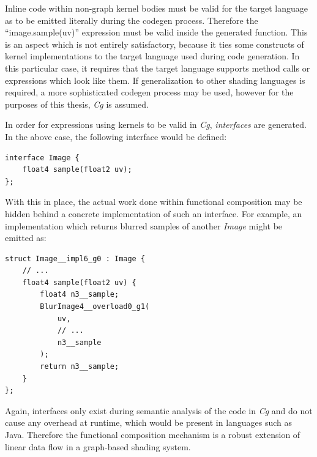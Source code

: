 Inline code within non-graph kernel bodies must be valid for the target language as to be emitted literally during the codegen process. Therefore the ``image.sample(uv)'' expression must be valid inside the generated function. This is an aspect which is not entirely satisfactory, because it ties some constructs of kernel implementations to the target language used during code generation. In this particular case, it requires that the target language supports method calls or expressions which look like them. If generalization to other shading languages is required, a more sophisticated codegen process may be used, however for the purposes of this thesis, \emph{Cg} is assumed.

In order for expressions using kernels to be valid in \emph{Cg}, \emph{interfaces} are generated. In the above case, the following interface would be defined:
\begin{lstlisting}[frame=single]
interface Image {
	float4 sample(float2 uv);
};
\end{lstlisting}

With this in place, the actual work done within functional composition may be hidden behind a concrete implementation of such an interface. For example, an implementation which returns blurred samples of another \emph{Image} might be emitted as:
\begin{lstlisting}[frame=single]
struct Image__impl6_g0 : Image {
	// ...
	float4 sample(float2 uv) {
		float4 n3__sample;
		BlurImage4__overload0_g1(
			uv,
			// ...
			n3__sample
		);
		return n3__sample;
	}
};
\end{lstlisting}

Again, interfaces only exist during semantic analysis of the code in \emph{Cg} and do not cause any overhead at runtime, which would be present in languages such as Java. Therefore the functional composition mechanism is a robust extension of linear data flow in a graph-based shading system.
